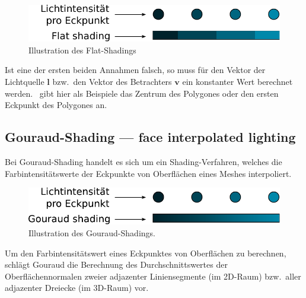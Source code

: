\begin{figure}[H]
    \centering
    \includegraphics{img/flat_shading.pdf}
    \caption{Illustration des Flat-Shadings\protect\footnotemark}\label{
        fig:flat_shading_illustration}
\end{figure}

Ist eine der ersten beiden Annahmen falsch, so muss für den Vektor der
Lichtquelle $\bm{l}$ bzw.\ den Vektor des Betrachters $\bm{v}$ ein
konstanter Wert berechnet werden.~\citet{foley_computer_1996} gibt
hier als Beispiele das Zentrum des Polygones oder den ersten Eckpunkt
des Polygones an.

\subsection{Gouraud-Shading --- face interpolated lighting}
\label{subsec:gouraud_shading}

Bei Gouraud-Shading handelt es sich um ein Shading-Verfahren, welches die
Farbintensitätswerte der Eckpunkte von Oberflächen eines Meshes interpoliert.

\begin{figure}[H]
    \centering
    \includegraphics{img/gouraud_shading.pdf}
    \caption{Illustration des Gouraud-Shadings\protect\footnotemark.}\label{
        fig:gouraud_shading_illustration}
\end{figure}

Um den Farbintensitätswert eines Eckpunktes von Oberflächen  zu berechnen,
schlägt Gouraud die Berechnung des Durchschnittswertes der Oberflächennormalen
zweier adjazenter Liniensegmente (im 2D-Raum) bzw.\  aller adjazenter Dreiecke
(im 3D-Raum) vor.

